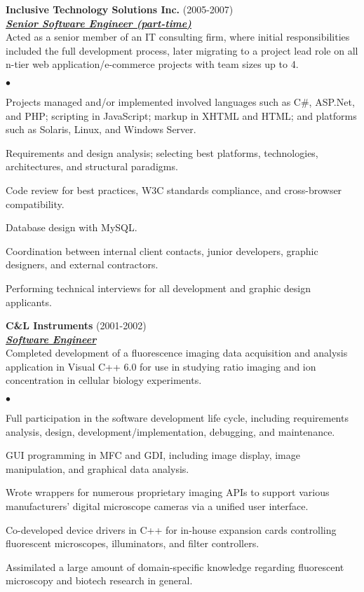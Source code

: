 \documentclass{article}
\newcommand{\employer}[3]{{ \textbf{#1} (#2)\\ \underline{\textbf{\emph{#3}}}\\  }}
\newenvironment{achievements}{\begin{list}{$\bullet$}{\topsep 0pt \itemsep
      -2pt}}{\vspace*{4pt}\end{list}}
\begin{document}
\employer{Inclusive Technology Solutions Inc.}{2005-2007}{Senior Software
  Engineer (part-time)} Acted as a senior member of an IT consulting firm,
where initial responsibilities included the full development process, later
migrating to a project lead role on all n-tier web application/e-commerce
projects with team sizes up to 4.
\begin{achievements}
\item Projects managed and/or implemented involved languages such as C\#,
  ASP.Net, and PHP; scripting in JavaScript; markup in XHTML and HTML; and
  platforms such as Solaris, Linux, and Windows Server.
\item Requirements and design analysis; selecting best platforms, technologies,
  architectures, and structural paradigms.
\item Code review for best practices, W3C standards compliance, and
  cross-browser compatibility.
\item Database design with MySQL.
\item Coordination between internal client contacts, junior developers, graphic
  designers, and external contractors.
\item Performing technical interviews for all development and graphic design
  applicants.
\end{achievements}

\employer{C\&L Instruments}{2001-2002}{Software Engineer} Completed development
of a fluorescence imaging data acquisition and analysis application in Visual
C++ 6.0 for use in studying ratio imaging and ion concentration in cellular
biology experiments.
\begin{achievements}
\item Full participation in the software development life cycle, including
  requirements analysis, design, development/implementation, debugging, and
  maintenance.
\item GUI programming in MFC and GDI, including image display, image
  manipulation, and graphical data analysis.
\item Wrote wrappers for numerous proprietary imaging APIs to support various
  manufacturers' digital microscope cameras via a unified user interface.
\item Co-developed device drivers in C++ for in-house expansion cards
  controlling fluorescent microscopes, illuminators, and filter controllers.
\item Assimilated a large amount of domain-specific knowledge regarding
  fluorescent microscopy and biotech research in general.
\end{achievements}
\end{document}
